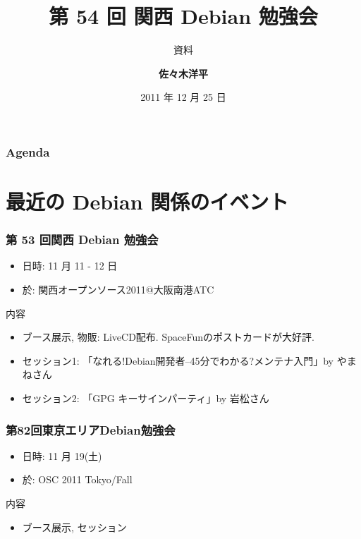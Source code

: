 \documentclass[cjk,dvipdfmx,10pt,%
hyperref={bookmarks=true,bookmarksnumbered=true,bookmarksopen=false,%
colorlinks=false,%
pdftitle={第 54 回 関西 Debian 勉強会},%
pdfauthor={倉敷・のがた・佐々木},%
pdfsubject={資料},%
}]{beamer}
\title{第 54 回 関西 Debian 勉強会}
\subtitle{{\small{資料}}}
\author[佐々木 洋平]{{\large\textbf{佐々木洋平}}}
\institute[Debian JP]{{\normalsize\texttt{関西Debian勉強会}}}
\date{{\small 2011 年 12 月 25 日}}
\begin{document}
\settitleslide
\begin{frame}
\titlepage
\end{frame}
\setdefaultslide

\begin{frame}[fragile]
\frametitle{Agenda}
\tableofcontents
\end{frame}

\section{最近の Debian 関係のイベント}


\begin{frame}[fragile]
\frametitle{第 53 回関西 Debian 勉強会}

\begin{itemize}
\item 日時: 11 月 11 - 12 日
\item 於: 関西オープンソース2011@大阪南港ATC
\end{itemize}

\begin{block}{内容}
  \begin{itemize}
  \item ブース展示, 物販: LiveCD配布. SpaceFunのポストカードが大好評.
  \item セッション1:
    「なれる!Debian開発者--45分でわかる?メンテナ入門」by やまねさん
  \item セッション2:
    「GPG キーサインパーティ」by 岩松さん
  \end{itemize}
\end{block}
\end{frame}


\begin{frame}[fragile]
  \frametitle{第82回東京エリアDebian勉強会}
  \begin{itemize}
  \item 日時: 11 月 19(土)
  \item 於: OSC 2011 Tokyo/Fall
  \end{itemize}
  \begin{block}{内容}
    \begin{itemize}
    \item ブース展示, セッション
    \end{itemize}
  \end{block}
\end{frame}
\end{document}
